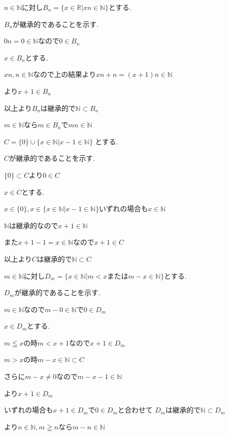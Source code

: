 \documentclass{jsarticle}
\begin{document}
       $n\in \mathbb{N}$に対し$B_n=\{x\in \mathbb{R}|xn\in\mathbb{N}\}$とする.
       
       $B_n$が継承的であることを示す.
       
       $0n = 0\in \mathbb{N}$なので$0\in B_n$
       
       $x\in B_n$とする.
       
       $xn,n\in \mathbb{N}$なので上の結果より$xn+n=(x+1)n\in \mathbb{N}$
       
       より$x+1\in B_n$
       
       以上より$B_n$は継承的で$\mathbb{N} \subset B_n$
       
       $m\in \mathbb{N}$なら$m\in B_n$で$mn\in\mathbb{N}$
       
       $C=\{0\}\cup \{x\in \mathbb{N}|x-1\in\mathbb{N}\}$
       とする.
       
       $C$が継承的であることを示す.
       
       $\{0\}\subset C$より$0\in C$
       
       $x\in C$とする.
       
       $x\in\{0\},x\in \{x\in \mathbb{N}|x-1\in\mathbb{N}\}$いずれの場合も$x\in\mathbb{N}$
       
       $\mathbb{N}$は継承的なので$x+1\in\mathbb{N}$
       
       また$x+1-1=x\in \mathbb{N}$なので$x+1\in C$
       
       以上より$C$は継承的で$\mathbb{N} \subset C$
       
       $m\in \mathbb{N}$に対し$D_m=\{x\in \mathbb{N}|m< x または m-x\in\mathbb{N}\}$とする.
       
       $D_m$が継承的であることを示す.
       
       $m\in \mathbb{N}$なので$m-0\in \mathbb{N}$で$0\in D_m$
       
       $x\in D_m$とする.
       
       $m\leqq x$の時$m<x+1$なので$x+1\in D_m$
       
       $m>x$の時$m-x\in \mathbb{N}\subset C$
       
       さらに$m-x\neq 0$なので$m-x-1\in\mathbb{N}$
       
       より$x+1\in D_m$
       
       いずれの場合も$x+1\in D_m$で$0\in D_m$と合わせて
       $D_m$は継承的で$\mathbb{N} \subset D_m$
       
       より$n\in \mathbb{N},m\geqq n$なら$m-n\in\mathbb{N}$
       
\end{document}
